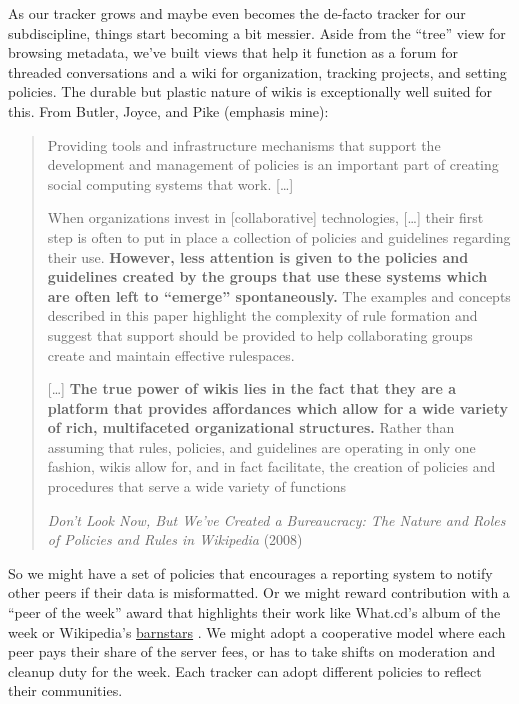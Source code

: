 As our tracker grows and maybe even becomes the de-facto tracker for our
subdiscipline, things start becoming a bit messier. Aside from the
``tree'' view for browsing metadata, we've built views that help it
function as a forum for threaded conversations and a wiki for
organization, tracking projects, and setting policies. The durable but
plastic nature of wikis is exceptionally well suited for this. From
Butler, Joyce, and Pike (emphasis mine):

\begin{quote}
Providing tools and infrastructure mechanisms that support the
development and management of policies is an important part of creating
social computing systems that work. {[}\ldots{]}

When organizations invest in {[}collaborative{]} technologies,
{[}\ldots{]} their first step is often to put in place a collection of
policies and guidelines regarding their use. \textbf{However, less
attention is given to the policies and guidelines created by the groups
that use these systems which are often left to ``emerge''
spontaneously.} The examples and concepts described in this paper
highlight the complexity of rule formation and suggest that support
should be provided to help collaborating groups create and maintain
effective rulespaces.

{[}\ldots{]} \textbf{The true power of wikis lies in the fact that they
are a platform that provides affordances which allow for a wide variety
of rich, multifaceted organizational structures.} Rather than assuming
that rules, policies, and guidelines are operating in only one fashion,
wikis allow for, and in fact facilitate, the creation of policies and
procedures that serve a wide variety of functions

\emph{Don't Look Now, But We've Created a Bureaucracy: The Nature and
Roles of Policies and Rules in Wikipedia} (2008) \citep{butlerDonLookNow2008} 
\end{quote}

So we might have a set of policies that encourages a reporting system to
notify other peers if their data is misformatted. Or we might reward
contribution with a ``peer of the week'' award that highlights their
work like What.cd's album of the week or Wikipedia's
\href{https://en.wikipedia.org/wiki/Wikipedia:Barnstars}{barnstars} \citep{wikipediaWikipediaBarnstars2022} . We might adopt a cooperative
model where each peer pays their share of the server fees, or has to
take shifts on moderation and cleanup duty for the week. Each tracker
can adopt different policies to reflect their communities.

